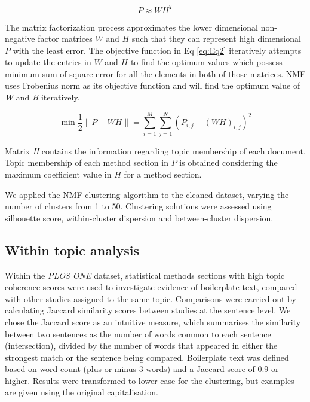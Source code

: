 \documentclass[12pt]{article}
\begin{document}
\begin{equation}
\label{eq:2}
 P \approx WH^{T}
\end{equation}

The matrix factorization process approximates the lower dimensional
non-negative factor matrices \(W\) and \(H\) such that they can
represent high dimensional \(P\) with the least error. The objective
function in Eq \ref{eq:Eq2} iteratively attempts to update the entries
in \(W\) and \(H\) to find the optimum values which possess minimum sum
of square error for all the elements in both of those matrices. NMF uses
Frobenius norm as its objective function and will find the optimum value
of \textit{W} and \textit{H} iteratively.

\begin{equation}
\label{eq:Eq2}
\min \frac{1}{2}\|P - WH\|= \sum _{i=1}^{M}\sum _{j=1}^{N} \left(  P_{i,j} -\left(WH \right)_{i,j} \right)^{2}
\end{equation}

Matrix \textit{H} contains the information regarding topic membership of
each document. Topic membership of each method section in \(P\) is
obtained considering the maximum coefficient value in \(H\) for a method
section.

We applied the NMF clustering algorithm to the cleaned dataset, varying
the number of clusters from 1 to 50. Clustering solutions were assessed
using silhouette score, within-cluster dispersion and between-cluster
dispersion.

\subsection{Within topic analysis}

Within the \emph{PLOS ONE} dataset, statistical methods sections with
high topic coherence scores were used to investigate evidence of
boilerplate text, compared with other studies assigned to the same
topic. Comparisons were carried out by calculating Jaccard similarity
scores between studies at the sentence level. We chose the Jaccard score
as an intuitive measure, which summarises the similarity between two
sentences as the number of words common to each sentence (intersection),
divided by the number of words that appeared in either the strongest
match or the sentence being compared. Boilerplate text was defined based
on word count (plus or minus 3 words) and a Jaccard score of 0.9 or
higher. Results were transformed to lower case for the clustering, but examples
are given using the original capitalisation.
\end{document}
